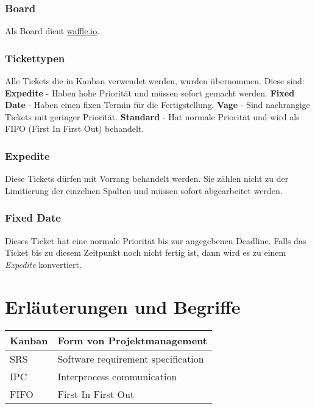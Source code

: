 \documentclass[a4paper]{book}
\begin{document}
\subsubsection{Board}
Als Board dient \href{https://waffle.io/chronos38/libipc-}{waffle.io}.

\subsubsection{Tickettypen}
Alle Tickets die in Kanban verwendet werden, wurden übernommen. Diese sind:\newline
\textbf{Expedite} - Haben hohe Priorität und müssen sofort gemacht werden.\newline
\textbf{Fixed Date} - Haben einen fixen Termin für die Fertigstellung.\newline
\textbf{Vage} - Sind nachrangige Tickets mit geringer Priorität.\newline
\textbf{Standard} - Hat normale Priorität und wird als FIFO (First In First Out) behandelt.

\subsubsection{Expedite}
Diese Tickets dürfen mit Vorrang behandelt werden. Sie zählen nicht zu der Limitierung der einzelnen Spalten und müssen sofort abgearbeitet werden.

\subsubsection{Fixed Date}
Dieses Ticket hat eine normale Priorität bis zur angegebenen Deadline. Falls das Ticket bis zu diesem Zeitpunkt noch nicht fertig ist, dann wird es zu einem \textit{Expedite} konvertiert.

\section{Erläuterungen und Begriffe}
\begin{center}
\begin{tabular}{|p{3cm}|p{8cm}|}
\hline
Kanban & Form von Projektmanagement \\
\hline
SRS & Software requirement specification \\
\hline
IPC & Interprocess communication \\
\hline
FIFO & First In First Out \\
\hline
\end{tabular}
\end{center}
\end{document}
